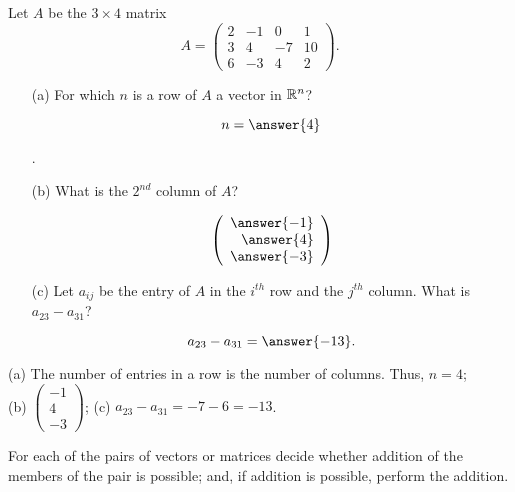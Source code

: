 \documentclass{article}
\begin{document}
\begin{exercise} \label{c1.1.2}
Let $A$ be the $3\times 4$ matrix
\[
A=\left(\begin{array}{rrrr} 2 & -1 & 0 & 1 \\ 3 & 4 & -7 & 10\\
        6 & -3 & 4 & 2 \end{array}\right).
\]
\begin{enumerate}
\item[(a)]  For which $n$ is a row of $A$ a vector in $\mathbb R^n$? \begin{prompt}\[n = \answer{4}\]\end{prompt}.
\item[(b)]  What is the $2^{nd}$ column of $A$?
  \begin{prompt}
    \[
      \left(\begin{array}{r} \answer{-1} \\ \answer{4} \\ \answer{-3} \end{array} \right)
    \]
  \end{prompt}
\item[(c)] Let $a_{ij}$ be the entry of $A$ in the $i^{th}$ row
  and the $j^{th}$ column.  What is $a_{23}-a_{31}$?
  \begin{prompt}
    \[
      a_{23}-a_{31} = \answer{-13}.
    \]
  \end{prompt}
\end{enumerate}

\begin{solution}

(a) The number of entries in a row is the number of columns.  Thus, $n = 4$; \\
(b) $\left(\begin{array}{r} -1 \\ 4 \\ -3 \end{array} \right)$;
(c) $a_{23}-a_{31} =  -7 - 6 = -13$.

\end{solution}
\end{exercise}





\problemlabel

\noindent For each of the pairs of vectors or matrices decide whether addition of the members of the pair is possible; and, if addition is possible, perform the addition.
\end{document}
